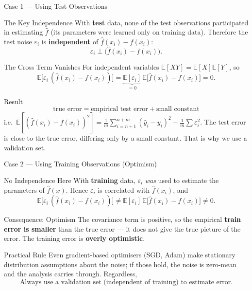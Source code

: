 \documentclass{beamer}
\begin{document}
\begin{frame}[shrink=10]{Case 1 --- Using Test Observations}
  \begin{block}{The Key Independence}
    With \textbf{test} data, none of the test observations participated in
    estimating $\hat f$ (its parameters were learned only on training
    data). Therefore the test noise $\varepsilon_i$ is \textbf{independent}
    of $\hat f(x_i) - f(x_i)$:
    \[
      \varepsilon_i \perp \bigl(\hat f(x_i) - f(x_i)\bigr).
    \]
  \end{block}

  \begin{block}{The Cross Term Vanishes}
    For independent variables $\mathbb{E}[XY] = \mathbb{E}[X]\mathbb{E}[Y]$,
    so
    \[
      \mathbb{E}\bigl[\varepsilon_i\,(\hat f(x_i)-f(x_i))\bigr]
        = \underbrace{\mathbb{E}[\varepsilon_i]}_{=0}\,
          \mathbb{E}\bigl[\hat f(x_i)-f(x_i)\bigr]
        = 0.
    \]
  \end{block}

  \begin{alertblock}{Result}
    \[
      \boxed{\;\text{true error} = \text{empirical test error} + \text{small constant}\;}
    \]
    i.e.\ $\mathbb{E}[(\hat f(x_i)-f(x_i))^2]
      = \frac{1}{m}\sum_{i=n+1}^{n+m}(\hat y_i - y_i)^2 - \frac1m\sum\varepsilon_i^2$.
    The test error is close to the true error, differing only by a small
    constant. That is why we use a validation set.
  \end{alertblock}
\end{frame}

\begin{frame}[shrink=10]{Case 2 --- Using Training Observations (Optimism)}
  \begin{block}{No Independence Here}
    With \textbf{training} data, $\varepsilon_i$ \emph{was} used to estimate
    the parameters of $\hat f(x)$. Hence $\varepsilon_i$ is correlated with
    $\hat f(x_i)$, and
    \[
      \mathbb{E}\bigl[\varepsilon_i\,(\hat f(x_i)-f(x_i))\bigr]
        \neq \mathbb{E}[\varepsilon_i]\,\mathbb{E}\bigl[\hat f(x_i)-f(x_i)\bigr]
        \neq 0.
    \]
  \end{block}

  \begin{block}{Consequence: Optimism}
    The covariance term is positive, so the empirical \textbf{train error
    is smaller} than the true error --- it does not give the true picture
    of the error. The training error is \textbf{overly optimistic}.
  \end{block}

  \begin{exampleblock}{Practical Rule}
    Even gradient-based optimisers (SGD, Adam) make stationary
    distribution assumptions about the noise; if those hold, the noise is
    zero-mean and the analysis carries through. Regardless,
    \[
      \boxed{\text{Always use a validation set (independent of training) to estimate error.}}
    \]
  \end{exampleblock}
\end{frame}
\end{document}
